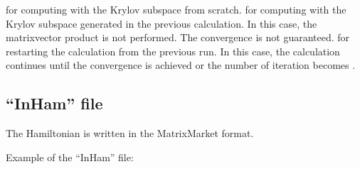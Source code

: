 \documentclass[letterpaper,10pt,dvipdfmx,openany,english]{sphinxmanual}
\begin{document}
\begin{itemize}
 for computing with the Krylov subspace from scratch.
 for computing with the Krylov subspace
generated in the previous calculation.
In this case, the matrix\sphinxhyphen{}vector product is not performed.
The convergence is not guaranteed.
 for restarting the calculation from the
previous run.
In this case, the calculation continues until
the convergence is achieved or the number of iteration becomes .

\end{itemize}


\subsection{“InHam” file}
\label{\detokenize{shiftk_format_en:inham-file}}\label{\detokenize{shiftk_format_en:ham}}
The Hamiltonian is written in the MatrixMarket format.

Example of the “InHam” file:
\end{document}
